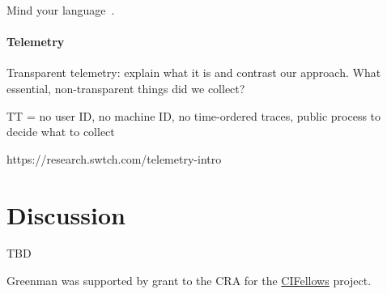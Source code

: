 \documentclass[
  acmsmall,
  review,
  anonymous,
]{acmart}
\begin{document}
Mind your language~\cite{mfk-onward-2011}.


\paragraph{Telemetry}

Transparent telemetry: explain what it is and contrast our approach.
What essential, non-transparent things did we collect?

TT =
no user ID, no machine ID,
no time-ordered traces,
public process to decide what to collect

https://research.swtch.com/telemetry-intro


\section{Discussion}
\label{s:conclusion}
\label{s:discussion}



\begin{acks}
  TBD

Greenman was supported by
   grant
 \href{"https://www.nsf.gov/awardsearch/showAward?AWD_ID=2030859"}{}
  to the CRA for the \href{https://cifellows2020.org}{CIFellows} project.
\end{acks}



\end{document}
